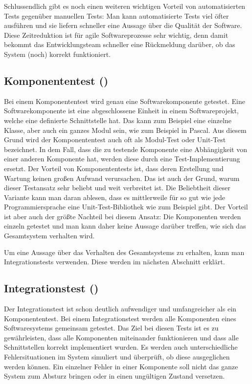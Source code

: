 \SuperPar
Schlussendlich gibt es noch einen weiteren wichtigen Vorteil von automatisierten Tests gegenüber manuellen Tests: Man kann automatisierte Tests viel öfter ausführen und sie liefern schneller eine Aussage über die Qualität der Software. Diese Zeitreduktion ist für agile Softwareprozesse sehr wichtig, denn damit bekommt das Entwicklungsteam schneller eine Rückmeldung darüber, ob das System (noch) korrekt funktioniert. 


\subsection{Komponententest ()}

Bei einem Komponententest \cite{xUnit} wird genau eine Softwarekomponente getestet. Eine Softwarekomponente ist eine abgeschlossene Einheit in einem Softwareprojekt, welche eine definierte Schnittstelle hat. Das kann zum Beispiel eine einzelne Klasse, aber auch ein ganzes Modul sein, wie zum Beispiel in Pascal. Aus diesem Grund wird der Komponententest auch oft als Modul-Test oder Unit-Test bezeichnet. In dem Fall, dass die zu testende Komponente eine Abhängigkeit von einer anderen Komponente hat, werden diese durch eine Test-Implementierung ersetzt. Der Vorteil von Komponententests ist, dass deren Erstellung und Wartung keinen großen Aufwand verursachen. Das ist auch der Grund, warum dieser Testansatz sehr beliebt und weit verbreitet ist. Die Beliebtheit dieser Variante kann man daran ablesen, dass es mittlerweile für so gut wie jede Programmiersprache eine Unit-Test-Bibliothek wie zum Beispiel  \cite{JUnit} gibt. Der Vorteil ist aber auch der größte Nachteil bei diesem Ansatz: Die Komponenten werden einzeln getestet und man kann daher keine Aussage darüber treffen, wie sich das Gesamtsystem verhalten wird.

\SuperPar
Um eine Aussage über das Verhalten des Gesamtsystems zu erhalten, kann man Integrationstests verwenden. Diese werden im nächsten Abschnitt erklärt.

\subsection{Integrationstest ()}

Der Integrationstest ist schon deutlich aufwendiger und umfangreicher als ein Komponententest. Bei einem Integrationstest werden alle Komponenten eines Softwaresystems gemeinsam getestet. Das Ziel bei diesen Tests ist es zu gewährleisten, dass alle Komponenten miteinander funktionieren und dass alle Schnittstellen korrekt implementiert wurden. Es werden auch unterschiedliche Fehlersituationen im System simuliert und überprüft, ob diese ausgeglichen werden können. Ein einzelner Fehler in einer Komponente soll nicht das ganze System zum Absturz bringen oder in einen ungültigen Zustand versetzen.

